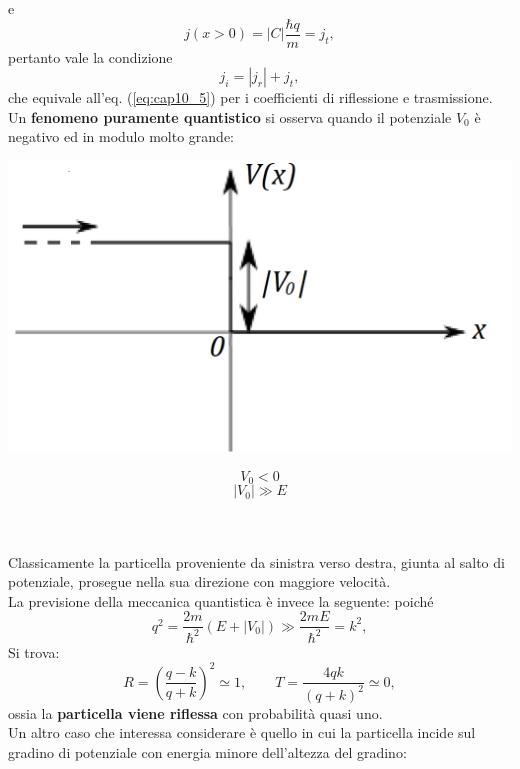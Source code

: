 e
\begin{equation}
j\left( x>0 \right) = |C| \frac{\hbar q}{m}= j_t,
\end{equation}
pertanto vale la condizione
\begin{equation}
j_i = |j_r|+ j_t,
\end{equation}
che equivale all'eq. (\ref{eq:cap10_5}) per i coefficienti di riflessione e trasmissione.\\
Un \textbf{fenomeno puramente quantistico} si osserva quando il potenziale $V_0$ è negativo ed in modulo molto grande:\\
\begin{minipage}{.7\textwidth}
\includegraphics[width=.9\textwidth]{immagini/cap_10/fig_10_6.png}
\end{minipage}
\hspace{.5cm}
\begin{minipage}{.1\textwidth}
\[V_0<0\]
\[|V_0| \gg E\]
\end{minipage}\\ \\
Classicamente la particella proveniente da sinistra verso destra, giunta al salto di potenziale, prosegue nella sua direzione con maggiore velocità.\\
La previsione della meccanica quantistica è invece la seguente: poiché
\begin{equation}
q^2=\frac{2m}{\hbar ^2}\left( E+ |V_0| \right) \gg \frac{2mE}{\hbar ^2} = k^2,
\end{equation}
Si trova:
\begin{equation}
R=\left( \frac{q-k}{q+k} \right) ^2 \simeq 1, \qquad T=\frac{4qk}{\left( q+k \right) ^2} \simeq 0,
\end{equation}
ossia la \textbf{particella viene riflessa} con probabilità quasi uno.\\
Un altro caso che interessa considerare è quello in cui la particella incide sul gradino di potenziale con energia minore dell'altezza del gradino:\\
